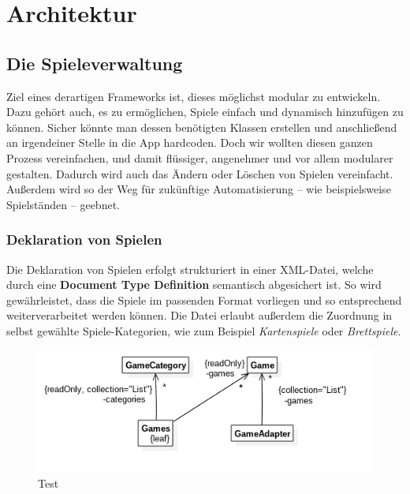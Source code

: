 \chapter{Architektur}

\section{Die Spieleverwaltung}
\sectionauthor{\frank}

Ziel eines derartigen Frameworks ist, dieses möglichst modular  zu entwickeln. Dazu gehört auch, es zu ermöglichen, Spiele einfach
und dynamisch hinzufügen zu können. Sicher könnte man dessen benötigten Klassen
erstellen und anschließend an irgendeiner Stelle in die App hardcoden. Doch wir
wollten diesen ganzen Prozess vereinfachen, und damit flüssiger, angenehmer und
vor allem modularer gestalten. Dadurch wird auch das Ändern oder Löschen von
Spielen vereinfacht. Außerdem wird so der Weg für zukünftige Automatisierung --
wie beispielsweise Spielständen -- geebnet.

\subsection{Deklaration von Spielen}

Die Deklaration von Spielen erfolgt strukturiert in einer XML-Datei, welche
durch eine \textbf{Document Type Definition} semantisch abgesichert ist. So
wird gewährleistet, dass die Spiele im passenden Format vorliegen und so
entsprechend weiterverarbeitet werden können. Die Datei erlaubt außerdem die
Zuordnung in selbst gewählte Spiele-Kategorien, wie zum Beispiel
\emph{Kartenspiele} oder \emph{Brettspiele}.

\begin{figure}[h]
	\centering
	\includegraphics{resources/gamemanager/gamemanager_uml}
	\caption{Test}
	\label{fig:gm_uml}
\end{figure}
